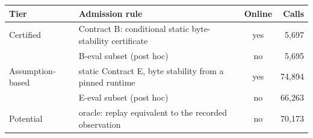 \begin{tabular}{@{}L{1.55cm}L{3.75cm}cr@{}}
\toprule
Tier & Admission rule & Online & Calls \\
\midrule
Certified & Contract B: conditional static byte-stability certificate & yes & 5,697 \\
 & \quad B-eval subset (post hoc) & no & 5,695 \\
Assumption-based & static Contract E, byte stability from a pinned runtime & yes & 74,894 \\
 & \quad E-eval subset (post hoc) & no & 66,263 \\
Potential & oracle: replay equivalent to the recorded observation & no & 70,173 \\
\bottomrule
\end{tabular}

